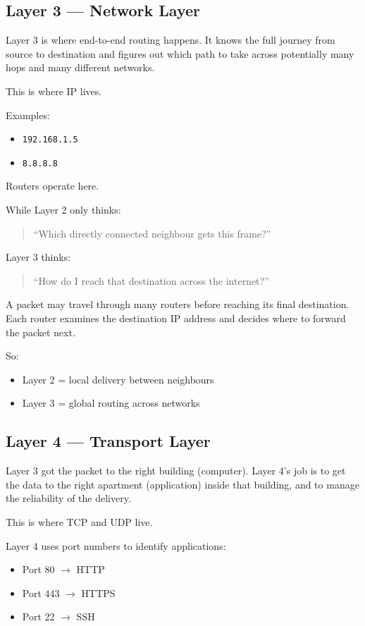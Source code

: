 \subsection*{Layer 3 --- Network Layer}

Layer 3 is where end-to-end routing happens. It knows the full journey from source to destination and figures out which path to take across potentially many hops and many different networks.

This is where IP lives.

Examples:
\begin{itemize}
    \item \texttt{192.168.1.5}
    \item \texttt{8.8.8.8}
\end{itemize}

Routers operate here.

While Layer 2 only thinks:

\begin{quote}
``Which directly connected neighbour gets this frame?''
\end{quote}

Layer 3 thinks:

\begin{quote}
``How do I reach that destination across the internet?''
\end{quote}

A packet may travel through many routers before reaching its final destination. Each router examines the destination IP address and decides where to forward the packet next.

So:
\begin{itemize}
    \item Layer 2 = local delivery between neighbours
    \item Layer 3 = global routing across networks
\end{itemize}

\subsection*{Layer 4 --- Transport Layer}

Layer 3 got the packet to the right building (computer). Layer 4's job is to get the data to the right apartment (application) inside that building, and to manage the reliability of the delivery.

This is where TCP and UDP live.

Layer 4 uses port numbers to identify applications:
\begin{itemize}
    \item Port 80 $\rightarrow$ HTTP
    \item Port 443 $\rightarrow$ HTTPS
    \item Port 22 $\rightarrow$ SSH
\end{itemize}

